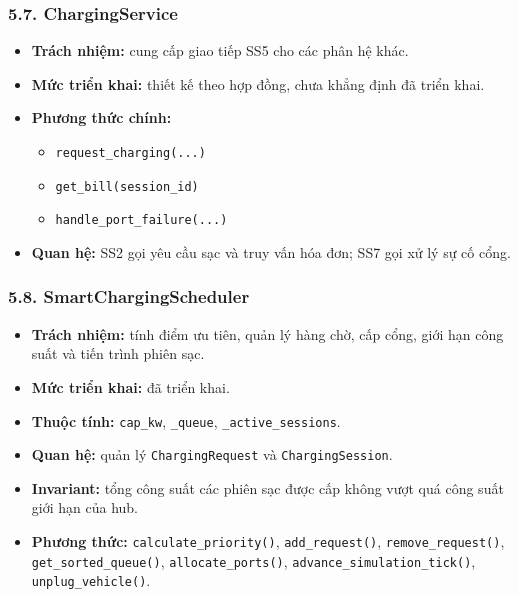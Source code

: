 \documentclass[11pt,a4paper]{article}
\providecommand{\tightlist}{%
  \setlength{\itemsep}{0pt}\setlength{\parskip}{0pt}}
\begin{document}
\hypertarget{chargingservice}{%
\subsubsection{5.7. ChargingService}\label{chargingservice}}

\begin{itemize}
\tightlist
\item
  \textbf{Trách nhiệm:} cung cấp giao tiếp SS5 cho các phân hệ khác.
\item
  \textbf{Mức triển khai:} thiết kế theo hợp đồng, chưa khẳng định đã
  triển khai.
\item
  \textbf{Phương thức chính:}

  \begin{itemize}
  \tightlist
  \item
    \texttt{request\_charging(...)}
  \item
    \texttt{get\_bill(session\_id)}
  \item
    \texttt{handle\_port\_failure(...)}
  \end{itemize}
\item
  \textbf{Quan hệ:} SS2 gọi yêu cầu sạc và truy vấn hóa đơn; SS7 gọi xử
  lý sự cố cổng.
\end{itemize}

\hypertarget{smartchargingscheduler}{%
\subsubsection{5.8.
SmartChargingScheduler}\label{smartchargingscheduler}}

\begin{itemize}
\tightlist
\item
  \textbf{Trách nhiệm:} tính điểm ưu tiên, quản lý hàng chờ, cấp cổng,
  giới hạn công suất và tiến trình phiên sạc.
\item
  \textbf{Mức triển khai:} đã triển khai.
\item
  \textbf{Thuộc tính:} \texttt{cap\_kw}, \texttt{\_queue},
  \texttt{\_active\_sessions}.
\item
  \textbf{Quan hệ:} quản lý \texttt{ChargingRequest} và
  \texttt{ChargingSession}.
\item
  \textbf{Invariant:} tổng công suất các phiên sạc được cấp không vượt
  quá công suất giới hạn của hub.
\item
  \textbf{Phương thức:} \texttt{calculate\_priority()},
  \texttt{add\_request()}, \texttt{remove\_request()},
  \texttt{get\_sorted\_queue()}, \texttt{allocate\_ports()},
  \texttt{advance\_simulation\_tick()}, \texttt{unplug\_vehicle()}.
\end{itemize}
\end{document}
